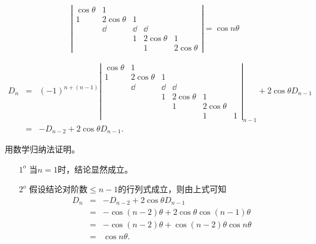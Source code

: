 \begin{frame}
  \begin{footnotesize}
    \begin{exampleblock}{39}
      $$
      \left|
      \begin{array}{ccccc}
        \cos\theta&1&&&\\
        1&2\cos\theta&1&&\\
        &\dd&\dd&\dd&\\
        &&1&2\cos\theta&1\\
        &&&1&2\cos\theta
      \end{array}
      \right|
      = \cos n \theta
      $$
    \end{exampleblock}
    \pause
    \proofname
    $$
    \begin{array}{rcl}
      D_n &=& (-1)^{n+(n-1)} \left|
      \begin{array}{cccccc}
        \cos\theta&1&&&&\\
        1&2\cos\theta&1&&&\\
        &\dd&\dd&\dd&&\\
        &&1&2\cos\theta&1&\\
        &&&1&2\cos\theta&\\
        &&&&1&1
      \end{array}
      \right|_{n-1} + 2\cos\theta D_{n-1}\\[0.4in]    
      &=& -  D_{n-2} + 2\cos\theta D_{n-1}.    
    \end{array}
    $$
  \end{footnotesize}
\end{frame}

\begin{frame}
  \begin{footnotesize}
    用数学归纳法证明。
    \begin{itemize}
    \item[$1^o$] 当$n=1$时，结论显然成立。
    \item[$2^o$] 假设结论对阶数$\le n-1$的行列式成立，则由上式可知
      $$
      \begin{array}{rcl}
        D_n &=& -D_{n-2} + 2\cos\theta D_{n-1} \\[0.2cm]
        &=& -\cos (n-2)\theta + 2\cos\theta\cos(n-1)\theta\\[0.2cm]
        &=& -\cos (n-2)\theta + \cos (n-2)\theta \cos n \theta\\[0.2cm]
        &=& \cos n\theta.
      \end{array}      
      $$
    \end{itemize}
  \end{footnotesize}
\end{frame}


